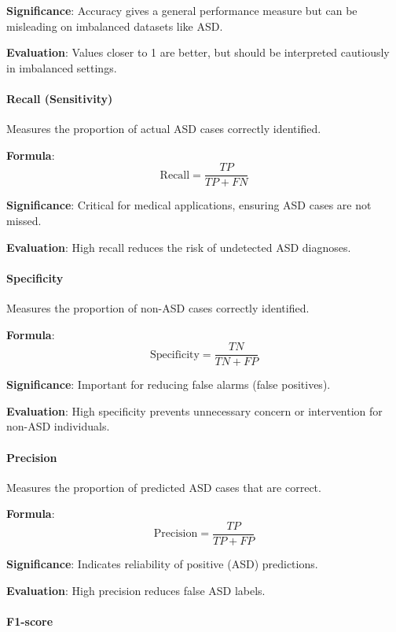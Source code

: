 \documentclass[conference]{IEEEtran}
\begin{document}
\textbf{Significance}: Accuracy gives a general performance measure but can be misleading on imbalanced datasets like ASD.  

\textbf{Evaluation}: Values closer to 1 are better, but should be interpreted cautiously in imbalanced settings.

\paragraph{Recall (Sensitivity)} 

Measures the proportion of actual ASD cases correctly identified.  

\textbf{Formula}:
\[
\text{Recall} = \frac{TP}{TP + FN}
\]

\textbf{Significance}: Critical for medical applications, ensuring ASD cases are not missed.  

\textbf{Evaluation}: High recall reduces the risk of undetected ASD diagnoses.

\paragraph{Specificity} 

Measures the proportion of non-ASD cases correctly identified. 

\textbf{Formula}:
\[
\text{Specificity} = \frac{TN}{TN + FP}
\]

\textbf{Significance}: Important for reducing false alarms (false positives).  

\textbf{Evaluation}: High specificity prevents unnecessary concern or intervention for non-ASD individuals.

\paragraph{Precision} 

Measures the proportion of predicted ASD cases that are correct.  

\textbf{Formula}:
\[
\text{Precision} = \frac{TP}{TP + FP}
\]

\textbf{Significance}: Indicates reliability of positive (ASD) predictions.  

\textbf{Evaluation}: High precision reduces false ASD labels.

\paragraph{F1-score} 
\end{document}
